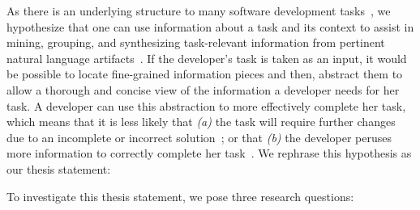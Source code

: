 As there is an underlying structure to many software development tasks~\cite{Murphy2005},
we hypothesize that one can use information about a task and its context to assist in mining, grouping, and synthesizing task-relevant information from
pertinent natural language artifacts~\cite{Starke2009, Bavota2016}.
If the developer's task is taken as an input, it would be possible to locate fine-grained information pieces and then,
abstract them to allow a thorough and concise view of the information a developer needs for her task.
A developer can use this abstraction to more effectively complete her task,
which means that it is less likely that \textit{(a)} the task will require further changes due to an incomplete or incorrect solution~\cite{Murphy2005};
or that \textit{(b)} the developer peruses more information to correctly complete her task~\cite{Rastkar2010}.
We rephrase this hypothesis as our thesis statement:







\noindent To investigate this thesis statement, we pose three research questions:

\vspace{1mm}

